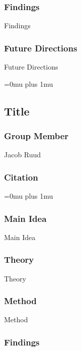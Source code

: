 \subsubsection{Findings}

\noindent
Findings

\subsubsection{Future Directions}

\noindent
Future Directions 

\Urlmuskip=0mu plus 1mu\relax

\noindent
\subsection{Title}

\subsubsection{Group Member}

\noindent
Jacob Ruud

\noindent
\subsubsection{Citation}

\Urlmuskip=0mu plus 1mu\relax

\subsubsection{Main Idea}

\noindent
Main Idea

\subsubsection{Theory}

\noindent
Theory

\subsubsection{Method}

\noindent
Method

\subsubsection{Findings}

